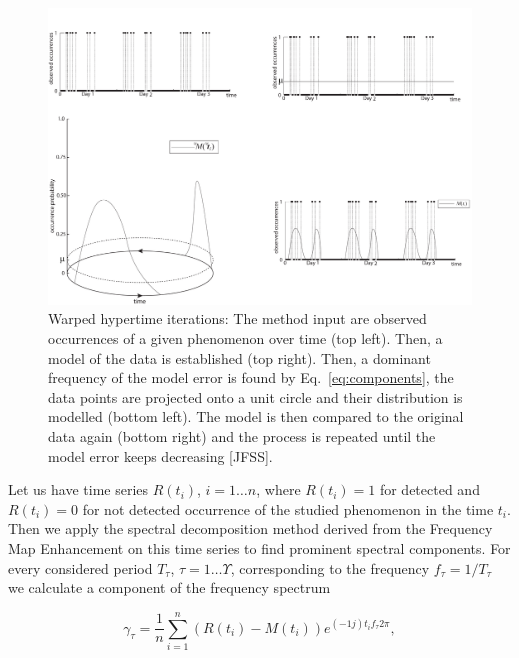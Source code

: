 \begin{figure}[!t]
\begin{center}
    \includegraphics[width=1.0\columnwidth]{fig/hypertime_graphs_a}
    \caption{Warped hypertime iterations: The method input are observed occurrences of a given phenomenon over time (top left). Then, a model of the data is established (top right). Then, a dominant frequency of the model error is found by Eq.~\ref{eq:components}, the data points are projected onto a unit circle and their distribution is modelled (bottom left). The model is then compared to the original data again (bottom right) and the process is repeated until the model error keeps decreasing [JFSS].\label{fig:whyte}}

\end{center}
\end{figure}



Let us have time series $R\left(t_{i}\right)$, $i = 1 \ldots n$, where $R\left(t_{i}\right) = 1$ for detected and $R\left(t_{i}\right) = 0$ for not detected occurrence of the studied phenomenon in the time $t_{i}$.
Then we apply the spectral decomposition method derived from the Frequency Map Enhancement \cite{krajnik2017fremen} on this time series to find prominent spectral components.
For every considered period $T_{\tau}$, $\tau = 1 \ldots \Upsilon$, corresponding to the frequency ${f}_{\tau} = 1 / T_{\tau}$ we calculate a component of the frequency spectrum

\begin{equation}\label{eq:components}
\gamma_{\tau} = \frac{1}{n} \sum_{i = 1}^{n} (R\left(t_{i}\right)-M\left(t_{i}\right))e^{(-1j)t_{i}{f}_{\tau}2\pi},
\end{equation}

